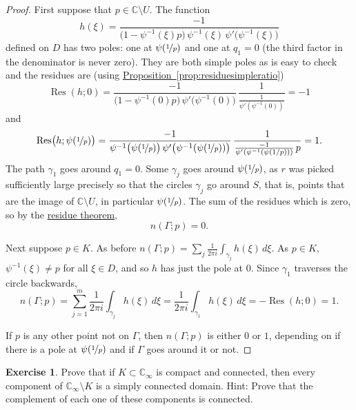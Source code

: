 \documentclass[12pt,openany]{book}
\newcommand{\C}{{\mathbb{C}}}
\theoremstyle{plain}
\theoremstyle{remark}
\theoremstyle{definition}
\newenvironment{exbox}{%
    \def\FrameCommand{\vrule width 1pt \relax\hspace{10pt}}%
    \MakeFramed{\advance\hsize-\width\FrameRestore}%
}{%
    \endMakeFramed
}
\theoremstyle{exercise}
\newtheorem{exercise}{Exercise}[section]
\theoremstyle{example}
\newcommand{\propref}[1]{\hyperref[#1]{Proposition~\ref*{#1}}}
\begin{document}
\begin{proof}
First suppose that $p \in \C \setminus U$.
The function 
\begin{equation*}
h(\xi) =
\frac{-1}{ \bigl( 1-\psi^{-1}(\xi)p \bigr)
\,
\psi^{-1}(\xi)
\,
\psi' \bigl(\psi^{-1}(\xi)\bigr)}
\end{equation*}
defined on $D$ has two poles: one at $\psi(\nicefrac{1}{p})$ and one
at $q_1=0$ (the third factor in the denominator is never zero).
They are both simple poles as is easy to check and the residues are (using
\propref{prop:residuesimpleratio})
\begin{equation*}
\operatorname{Res}(h;0) = 
\frac{-1}{ \bigl( 1-\psi^{-1}(0)p \bigr)
\,
\psi' \bigl(\psi^{-1}(0)\bigr)}
\,
\frac{1}{\frac{1}{\psi'(\psi^{-1}(0))}}
=
-1
\end{equation*}
and
\begin{equation*}
\operatorname{Res}\bigl(h;\psi(\nicefrac{1}{p})\bigr)
=
\frac{-1}{
\psi^{-1}\bigl(\psi(\nicefrac{1}{p})\bigr)
\,
\psi' \bigl(\psi^{-1}(\psi(\nicefrac{1}{p}))\bigr)
}
\,
\frac{1}{
\frac{-1}{\psi'(\psi^{-1}(\psi(1/p)))}
\, p
}
=
1 .
\end{equation*}
The path $\gamma_1$ goes around $q_1=0$.
Some $\gamma_j$ goes around
$\psi(\nicefrac{1}{p})$, as $r$ was picked sufficiently large
precisely so that the circles $\gamma_j$ go around $S$, that is, points that
are the image of $\C \setminus U$,
in particular $\psi(\nicefrac{1}{p})$.
The sum of the residues which is zero, so 
by the \hyperref[thm:residue]{residue theorem},
\begin{equation*}
n(\Gamma;p) = 0 .
\end{equation*}

Next suppose $p \in K$.  As before
$n(\Gamma;p) = 
\sum_j
\frac{1}{2\pi i}
\int_{\gamma_j} h(\xi) \, d\xi$.
As $p \in K$, $\psi^{-1}(\xi) \not= p$ for all $\xi \in D$,
and so $h$ has just the pole at $0$.
Since $\gamma_1$ traverses the circle backwards,
\begin{equation*}
n(\Gamma;p) = 
\sum_{j=1}^m
\frac{1}{2\pi i}
\int_{\gamma_j} h(\xi) \, d\xi 
=
\frac{1}{2\pi i}
\int_{\gamma_1} h(\xi) \, d\xi 
= - \operatorname{Res}(h;0) = 1 .
\end{equation*}

If $p$ is any other point not on $\Gamma$, then $n(\Gamma;p)$
is either $0$ or $1$, depending on if there is a pole at
$\psi(\nicefrac{1}{p})$ and if $\Gamma$ goes around it or not.
\end{proof}

\begin{exbox}
\begin{exercise}
Prove that if $K \subset \C_\infty$ is compact and connected, then 
every component of $\C_\infty \setminus K$ is a simply connected domain.
Hint: Prove that the complement of each one of these components is connected.
\end{exercise}
\end{exbox}
\end{document}
